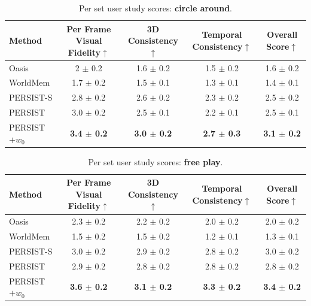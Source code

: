 \documentclass{article}
\theoremstyle{plain}
\theoremstyle{definition}
\theoremstyle{remark}
\begin{document}
\begin{table}[htb!]
\centering
\caption{Per set user study scores: \textbf{circle around}.}
\begin{tabular}{lcccc}
\toprule
Method & Per Frame Visual Fidelity$\uparrow$ & 3D Consistency$\uparrow$ & Temporal Consistency$\uparrow$ & Overall Score$\uparrow$ \\
\midrule
Oasis & 2 $\pm$ 0.2 & 1.6 $\pm$ 0.2 & 1.5 $\pm$ 0.2 & 1.6 $\pm$ 0.2 \\
WorldMem & 1.7 $\pm$ 0.2 & 1.5 $\pm$ 0.1 & 1.3 $\pm$ 0.1 & 1.4 $\pm$ 0.1 \\
PERSIST-S & 2.8 $\pm$ 0.2 & 2.6 $\pm$ 0.2 & 2.3 $\pm$ 0.2 & 2.5 $\pm$ 0.2 \\
PERSIST & 3.0 $\pm$ 0.2 & 2.5 $\pm$ 0.1 & 2.2 $\pm$ 0.1 & 2.5 $\pm$ 0.1 \\
PERSIST$+w_0$ & \textbf{3.4 $\pm$ 0.2} & \textbf{3.0 $\pm$ 0.2} & \textbf{2.7 $\pm$ 0.3} & \textbf{3.1 $\pm$ 0.2} \\
\bottomrule
\end{tabular}
\label{tab:user_study_scores_circle_around}
\end{table}

\begin{table}[htb!]
\centering
\caption{Per set user study scores: \textbf{free play}.}
\label{tab:user_study_scores_free_play}
\begin{tabular}{lcccc}
\toprule
Method & Per Frame Visual Fidelity$\uparrow$ & 3D Consistency$\uparrow$ & Temporal Consistency$\uparrow$ & Overall Score$\uparrow$ \\
\midrule
Oasis & 2.3 $\pm$ 0.2 & 2.2 $\pm$ 0.2 & 2.0 $\pm$ 0.2 & 2.0 $\pm$ 0.2 \\
WorldMem & 1.5 $\pm$ 0.2 & 1.5 $\pm$ 0.2 & 1.2 $\pm$ 0.1 & 1.3 $\pm$ 0.1 \\
PERSIST-S & 3.0 $\pm$ 0.2 & 2.9 $\pm$ 0.2 & 2.8 $\pm$ 0.2 & 3.0 $\pm$ 0.2 \\
PERSIST & 2.9 $\pm$ 0.2 & 2.8 $\pm$ 0.2 & 2.8 $\pm$ 0.2 & 2.8 $\pm$ 0.2 \\
PERSIST$+w_0$ & \textbf{3.6 $\pm$ 0.2} & \textbf{3.1 $\pm$ 0.2} & \textbf{3.3 $\pm$ 0.2} & \textbf{3.4 $\pm$ 0.2} \\
\bottomrule
\end{tabular}
\end{table}
\end{document}
